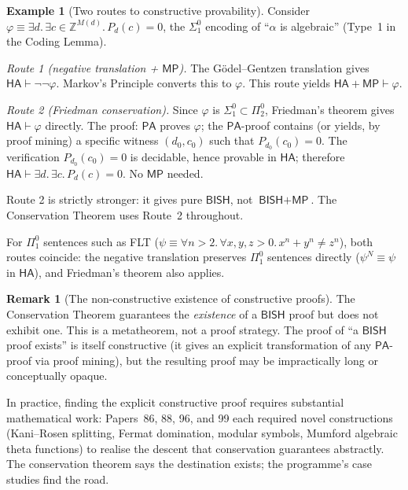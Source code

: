 \documentclass[11pt,a4paper]{article}
\theoremstyle{plain}
\theoremstyle{definition}
\newtheorem{example}[theorem]{Example}
\newtheorem{remark}[theorem]{Remark}
\newcommand{\BISH}{\textsf{BISH}}
\newcommand{\MP}{\textsf{MP}}
\newcommand{\HA}{\textsf{HA}}
\newcommand{\PA}{\textsf{PA}}
\newcommand{\Z}{\mathbb{Z}}
\begin{document}
\begin{example}[Two routes to constructive provability]\label{ex:worked}
Consider $\varphi \equiv \exists d.\, \exists c \in \Z^{M(d)}.\, P_d(c) = 0$, the $\Sigma^0_1$ encoding of ``$\alpha$ is algebraic'' (Type~1 in the Coding Lemma).

\emph{Route 1 (negative translation + $\MP$).}  The G\"odel--Gentzen translation gives $\HA \vdash \lnot\lnot\varphi$.  Markov's Principle converts this to $\varphi$.  This route yields $\HA + \MP \vdash \varphi$.

\emph{Route 2 (Friedman conservation).}  Since $\varphi$ is $\Sigma^0_1 \subset \Pi^0_2$, Friedman's theorem gives $\HA \vdash \varphi$ directly.  The proof: $\PA$ proves $\varphi$; the $\PA$-proof contains (or yields, by proof mining) a specific witness $(d_0, c_0)$ such that $P_{d_0}(c_0) = 0$.  The verification $P_{d_0}(c_0) = 0$ is decidable, hence provable in $\HA$; therefore $\HA \vdash \exists d.\, \exists c.\, P_d(c) = 0$.  No $\MP$ needed.

Route 2 is strictly stronger: it gives pure $\BISH$, not $\BISH + \MP$.  The Conservation Theorem uses Route~2 throughout.

For $\Pi^0_1$ sentences such as FLT ($\psi \equiv \forall n > 2.\, \forall x,y,z > 0.\, x^n + y^n \ne z^n$), both routes coincide: the negative translation preserves $\Pi^0_1$ sentences directly ($\psi^N \equiv \psi$ in $\HA$), and Friedman's theorem also applies.
\end{example}

\begin{remark}[The non-constructive existence of constructive proofs]\label{rem:non-constructive}
The Conservation Theorem guarantees the \emph{existence} of a $\BISH$ proof but does not exhibit one.  This is a metatheorem, not a proof strategy.  The proof of ``a $\BISH$ proof exists'' is itself constructive (it gives an explicit transformation of any $\PA$-proof via proof mining), but the resulting proof may be impractically long or conceptually opaque.

In practice, finding the explicit constructive proof requires substantial mathematical work: Papers~86, 88, 96, and 99 each required novel constructions (Kani--Rosen splitting, Fermat domination, modular symbols, Mumford algebraic theta functions) to realise the descent that conservation guarantees abstractly.  The conservation theorem says the destination exists; the programme's case studies find the road.
\end{remark}
\end{document}
